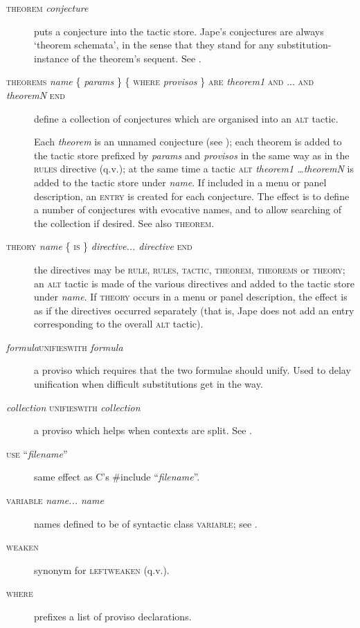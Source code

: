 \begin{description}
\item[\textsc{theorem} \textit{conjecture}] puts a conjecture into the tactic store. Jape's conjectures are always `theorem schemata', in the sense that they stand for any substitution-instance of the theorem's sequent. See .

\item[\textsc{theorems} \textit{name} \{ \textit{params} \} \{ \textsc{where} \textit{provisos} \} \textsc{are} \textit{theorem1} \textsc{and} ... \textsc{and} \textit{theoremN} \textsc{end}] define a collection of conjectures which are organised into an \textsc{alt} tactic.

Each \textit{theorem} is an unnamed conjecture (see ); each theorem is added to the tactic store prefixed by \textit{params} and \textit{provisos} in the same way as in the \textsc{rules} directive (q.v.); at the same time a tactic \textsc{alt} \textit{theorem1 \dots theoremN} is added to the tactic store under \textit{name}. If included in a menu or panel description, an \textsc{entry} is created for each conjecture. The effect is to define a number of conjectures with evocative names, and to allow searching of the collection if desired. See also \textsc{theorem}.

\item[\textsc{theory} \textit{name} \{ \textsc{is} \} \textit{directive... directive} \textsc{end}] the directives may be \textsc{rule, rules, tactic, theorem, theorems} or \textsc{theory}; an \textsc{alt} tactic is made of the various directives and added to the tactic store under \textit{name}. If \textsc{theory} occurs in a menu or panel description, the effect is as if the directives occurred separately (that is, Jape does not add an entry corresponding to the overall \textsc{alt} tactic).

\item[\textit{formula}\textsc{unifieswith} \textit{formula}] a proviso which requires that the two formulae should unify. Used to delay unification when difficult substitutions get in the way.


\item[\textit{collection} \textsc{unifieswith} \textit{collection}] a proviso which helps when contexts are split. See .

\item[\textsc{use} ``\textit{filename}''] same effect as C's \#include ``\textit{filename}''.

\item[\textsc{variable} \textit{name... name}] names defined to be of syntactic class \textsc{variable}; see .

\item[\textsc{weaken}] synonym for \textsc{leftweaken} (q.v.).

\item[\textsc{where}] prefixes a list of proviso declarations.
\end{description}
 
